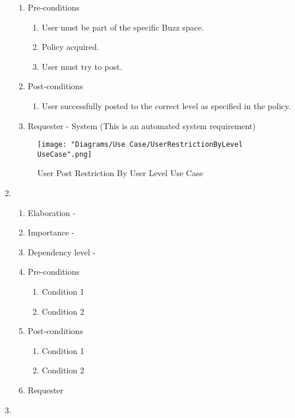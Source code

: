\documentclass[12pt]{article}
\begin{document}
\begin{enumerate}
\begin{enumerate}
    \item Pre-conditions
    \begin{enumerate}
    	\item User must be part of the specific Buzz space.
    	\item Policy acquired.
    	\item User must try to post.
    \end{enumerate}
        \item Post-conditions
    \begin{enumerate}
    	\item User successfully posted to the correct level as specified in the policy.
    \end{enumerate}
    \item Requester - System (This is an automated system requirement)
  \end{enumerate}
\begin{figure}[h]
	\centering
	\texttt{[image: "Diagrams/Use Case/UserRestrictionByLevel UseCase".png]}
	\caption{User Post Restriction By User Level Use Case}
\end{figure}
\newpage %
   \item  %
  \begin{enumerate}
    \item Elaboration - 
    \item Importance - 
    \item Dependency level - 
    \item Pre-conditions
    \begin{enumerate}
    	\item Condition 1
    	\item Condition 2
    \end{enumerate}
        \item Post-conditions
    \begin{enumerate}
    	\item Condition 1
    	\item Condition 2
    \end{enumerate}
    \item Requester
  \end{enumerate}
\newpage %
   \item  %
  \begin{enumerate}

\end{enumerate}
\end{enumerate}
\end{document}
